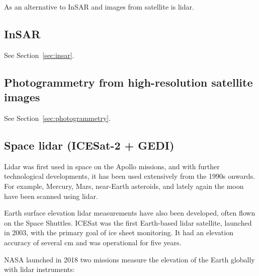 As an alternative to InSAR and images from satellite is lidar.



\subsection{InSAR}

See Section~\ref{sec:insar}.


\subsection{Photogrammetry from high-resolution satellite images}

See Section~\ref{sec:photogrammetry}.

\subsection{Space lidar (ICESat-2 + GEDI)}

Lidar was first used in space on the Apollo missions, and with further technological developments, it has been used extensively from the 1990s onwards.
For example, Mercury, Mars, near-Earth asteroids, and lately again the moon have been scanned using lidar.

%

Earth surface elevation lidar measurements have also been developed, often flown on the Space Shuttles.
ICESat was the first Earth-based lidar satellite, launched in 2003, with the primary goal of ice sheet monitoring.
It had an elevation accuracy of several cm and was operational for five years.

%

NASA launched in 2018 two missions measure the elevation of the Earth globally with lidar instruments: 

